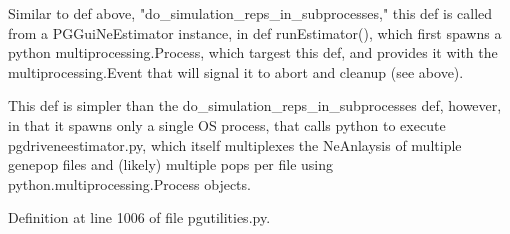 \begin{DoxyVerb}Similar to def above, "do_simulation_reps_in_subprocesses," this def is called from a
PGGuiNeEstimator instance, in def runEstimator(), which first spawns
a python multiprocessing.Process, which targest this def, and provides
it with the multiprocessing.Event that will signal it to abort and cleanup
(see above).

This def is simpler than the do_simulation_reps_in_subprocesses def, however, in that it
spawns only a single OS process, that calls python to execute pgdriveneestimator.py,
which itself multiplexes the NeAnlaysis of multiple genepop files and (likely) multiple
pops per file using python.multiprocessing.Process objects.
\end{DoxyVerb}
 

Definition at line 1006 of file pgutilities.\+py.


